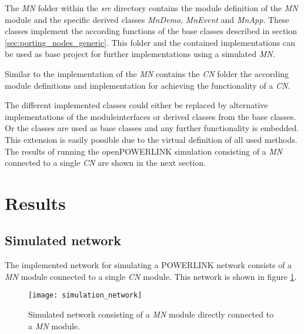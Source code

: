 The \emph{MN} folder within the \emph{src} directory contains the module definition of the \emph{MN} module and the specific derived classes \emph{MnDemo}, \emph{MnEvent} and \emph{MnApp}.
These classes implement the according functions of the base classes described in section \ref{sec:porting_nodes_generic}.
This folder and the contained implementations can be used as base project for further implementations using a simulated \emph{MN}.

Similar to the implementation of the \emph{MN} contains the \emph{CN} folder the according module definitions and implementation for achieving the functionality of a \emph{CN}.

The different implemented classes could either be replaced by alternative implementations of the moduleinterfaces or derived classes from the base classes.
Or the classes are used as base classes and any further functionality is embedded.
This extension is easily possible due to the virtual definition of all used methods.
\\

The results of running the openPOWERLINK simulation consisting of a \emph{MN} connected to a single \emph{CN} are shown in the next section.

\section{Results}
\label{sec:porting_results}

\subsection{Simulated network}
\label{sec:porting_results_network}
The implemented network for simulating a POWERLINK network consists of a \emph{MN} module connected to a single \emph{CN} module.
This network is shown in figure \ref{fig:simulation_network}.

\begin{figure}
    \centering
    \texttt{[image: simulation\_network]}
    \caption{Simulated network consisting of a \emph{MN} module directly connected to a \emph{MN} module.}
    \label{fig:simulation_network}
\end{figure}